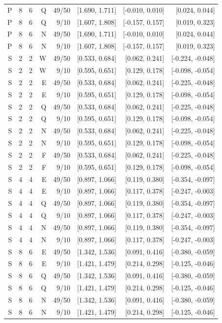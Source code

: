 \begin{longtable}{rrrrrrrr}
P & 8 & 6 & Q & 49/50 & [1.690, 1.711] & [-0.010, 0.010] & [0.024, 0.044] \\
P & 8 & 6 & Q & 9/10 & [1.607, 1.808] & [-0.157, 0.157] & [0.019, 0.323] \\
P & 8 & 6 & N & 49/50 & [1.690, 1.711] & [-0.010, 0.010] & [0.024, 0.044] \\
P & 8 & 6 & N & 9/10 & [1.607, 1.808] & [-0.157, 0.157] & [0.019, 0.323] \\
S & 2 & 2 & W & 49/50 & [0.533, 0.684] & [0.062, 0.241] & [-0.224, -0.048] \\
S & 2 & 2 & W & 9/10 & [0.595, 0.651] & [0.129, 0.178] & [-0.098, -0.054] \\
S & 2 & 2 & E & 49/50 & [0.533, 0.684] & [0.062, 0.241] & [-0.225, -0.048] \\
S & 2 & 2 & E & 9/10 & [0.595, 0.651] & [0.129, 0.178] & [-0.098, -0.054] \\
S & 2 & 2 & Q & 49/50 & [0.533, 0.684] & [0.062, 0.241] & [-0.225, -0.048] \\
S & 2 & 2 & Q & 9/10 & [0.595, 0.651] & [0.129, 0.178] & [-0.098, -0.054] \\
S & 2 & 2 & N & 49/50 & [0.533, 0.684] & [0.062, 0.241] & [-0.225, -0.048] \\
S & 2 & 2 & N & 9/10 & [0.595, 0.651] & [0.129, 0.178] & [-0.098, -0.054] \\
S & 2 & 2 & F & 49/50 & [0.533, 0.684] & [0.062, 0.241] & [-0.225, -0.048] \\
S & 2 & 2 & F & 9/10 & [0.595, 0.651] & [0.129, 0.178] & [-0.098, -0.054] \\
S & 4 & 4 & E & 49/50 & [0.897, 1.066] & [0.119, 0.380] & [-0.354, -0.097] \\
S & 4 & 4 & E & 9/10 & [0.897, 1.066] & [0.117, 0.378] & [-0.247, -0.003] \\
S & 4 & 4 & Q & 49/50 & [0.897, 1.066] & [0.119, 0.380] & [-0.354, -0.097] \\
S & 4 & 4 & Q & 9/10 & [0.897, 1.066] & [0.117, 0.378] & [-0.247, -0.003] \\
S & 4 & 4 & N & 49/50 & [0.897, 1.066] & [0.119, 0.380] & [-0.354, -0.097] \\
S & 4 & 4 & N & 9/10 & [0.897, 1.066] & [0.117, 0.378] & [-0.247, -0.003] \\
S & 8 & 6 & E & 49/50 & [1.342, 1.536] & [0.091, 0.416] & [-0.380, -0.059] \\
S & 8 & 6 & E & 9/10 & [1.421, 1.479] & [0.214, 0.298] & [-0.125, -0.046] \\
S & 8 & 6 & Q & 49/50 & [1.342, 1.536] & [0.091, 0.416] & [-0.380, -0.059] \\
S & 8 & 6 & Q & 9/10 & [1.421, 1.479] & [0.214, 0.298] & [-0.125, -0.046] \\
S & 8 & 6 & N & 49/50 & [1.342, 1.536] & [0.091, 0.416] & [-0.380, -0.059] \\
S & 8 & 6 & N & 9/10 & [1.421, 1.479] & [0.214, 0.298] & [-0.125, -0.046] \\
\bottomrule
\end{longtable}
